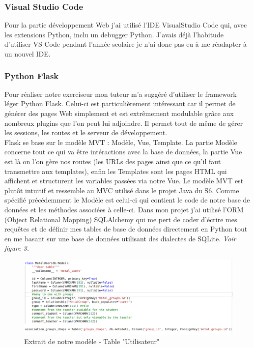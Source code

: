 \documentclass[12pt]{article}
\begin{document}
\subsubsection{Visual Studio Code}
Pour la partie développement Web j'ai utilisé l'IDE  VisualStudio Code qui, avec les extensions Python, inclu un debugger Python. J'avais déjà l'habitude d'utiliser VS Code pendant l'année scolaire je n'ai donc pas eu à me réadapter à un nouvel IDE.

\subsubsection{Python Flask}

Pour réaliser notre exerciseur mon tuteur m’a suggéré d’utiliser le framework léger Python Flask. Celui-ci est particulièrement intéressant car il permet de générer des pages Web simplement et est extrêmement modulable grâce aux nombreux plugins que l’on peut lui adjoindre. Il permet tout de même de gérer les sessions, les routes et le serveur de développement. \\
Flask se base sur le modèle MVT : Modèle, Vue, Template. La partie Modèle concerne tout ce qui va être intéractions avec la base de données, la partie Vue est là on l'on gère nos routes (les URLs des pages ainsi que ce qu'il faut transmettre aux templates), enfin les Templates sont les pages HTML qui affichent et structurent les variables passées via notre Vue. Le modèle MVT est plutôt intuitif et ressemble au MVC utilisé dans le projet Java du S6. 
Comme spécifié précédemment le Modèle est celui-ci qui contient le code de notre base de données et les méthodes associées à celle-ci. Dans mon projet j'ai utilisé l'ORM (Object Relational Mapping) SQLAlchemy qui me pert de coder d'écrire mes requêtes et de définir mes tables de base de données directement en Python tout en me basant sur une base de données utilisant des dialectes de SQLite. \textit{Voir figure 3.}

\begin{figure}[h]
    \centering
    \includegraphics[scale=0.3]{ex_models.png}
    \caption{Extrait de notre modèle - Table "Utilisateur" }
    \label{fig:ex_models}
\end{figure}
\end{document}
